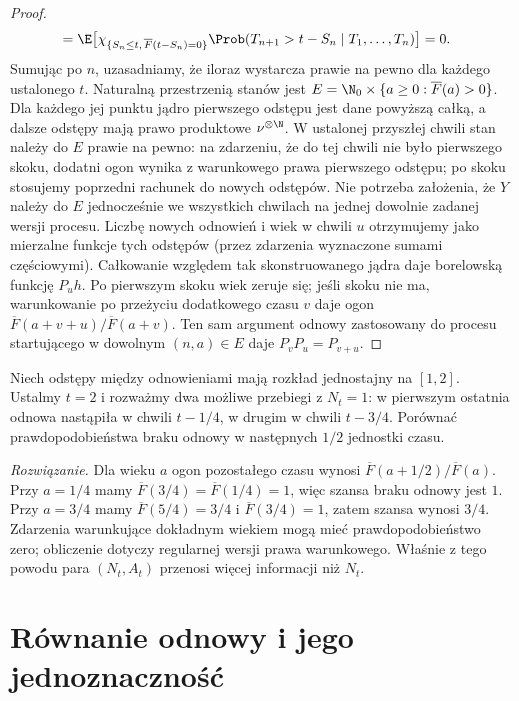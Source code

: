 \begin{proof}
\[\begin{aligned}
&=\E\bigl[\chi_{\{S_n\le t,\,\overline F(t-S_n)=0\}}
     \Prob(T_{n+1}>t-S_n\mid T_1,\ldots,T_n)\bigr]=0.
\end{aligned}
\]
Sumując po $n$, uzasadniamy, że iloraz wystarcza
prawie na pewno dla każdego ustalonego $t$.
Naturalną przestrzenią stanów jest
$E=\N_0\times\{a\ge0:\overline F(a)>0\}$.
Dla każdego jej punktu jądro pierwszego odstępu
jest dane powyższą całką, a dalsze odstępy mają
prawo produktowe $\nu^{\otimes\N}$.
W ustalonej przyszłej chwili stan należy do $E$
prawie na pewno: na zdarzeniu, że do tej chwili
nie było pierwszego skoku, dodatni ogon wynika
z warunkowego prawa pierwszego odstępu; po skoku
stosujemy poprzedni rachunek do nowych odstępów.
Nie potrzeba założenia, że $Y$ należy do $E$
jednocześnie we wszystkich chwilach na jednej
dowolnie zadanej wersji procesu.
Liczbę nowych odnowień i wiek w chwili $u$
otrzymujemy jako mierzalne funkcje tych odstępów
(przez zdarzenia wyznaczone sumami częściowymi).
Całkowanie względem tak skonstruowanego jądra daje
borelowską funkcję $P_uh$.
Po pierwszym skoku wiek zeruje się; jeśli skoku nie
ma, warunkowanie po przeżyciu dodatkowego czasu
$v$ daje ogon $\overline F(a+v+u)/\overline F(a+v)$.
Ten sam argument odnowy zastosowany do procesu
startującego w dowolnym $(n,a)\in E$ daje
$P_vP_u=P_{v+u}$.
\end{proof}

\begin{zadanie}
Niech odstępy między odnowieniami mają rozkład jednostajny
na $[1,2]$. Ustalmy $t=2$ i rozważmy dwa możliwe przebiegi
z $N_t=1$: w pierwszym ostatnia odnowa nastąpiła w chwili
$t-1/4$, w drugim w chwili $t-3/4$. Porównać prawdopodobieństwa
braku odnowy w następnych $1/2$ jednostki czasu.

\emph{Rozwiązanie.} Dla wieku $a$ ogon pozostałego czasu
wynosi $\overline F(a+1/2)/\overline F(a)$.
Przy $a=1/4$ mamy $\overline F(3/4)=\overline F(1/4)=1$,
więc szansa braku odnowy jest $1$. Przy $a=3/4$ mamy
$\overline F(5/4)=3/4$ i $\overline F(3/4)=1$, zatem
szansa wynosi $3/4$. Zdarzenia warunkujące dokładnym
wiekiem mogą mieć prawdopodobieństwo zero; obliczenie
dotyczy regularnej wersji prawa warunkowego. Właśnie z tego
powodu para $(N_t,A_t)$ przenosi więcej informacji niż $N_t$.
\end{zadanie}

\section{Równanie odnowy i jego jednoznaczność}

